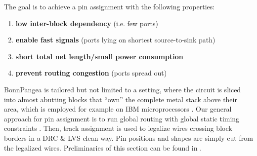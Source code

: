 \documentclass[a2paper]{bigsposter}
\begin{document}
\begin{blockrow}[3]
 \label{sec:modfied_global;_routing}
 The goal is to achieve a pin assignment with the following properties:
 \begin{enumerate}
 	\item \textbf{low inter-block dependency} (i.e. few ports)
 	\item \textbf{enable fast signals} (ports lying on shortest source-to-sink path)
 	\item \textbf{short total net length/small power consumption}
 	\item \textbf{prevent routing congestion} (ports spread out)
 \end{enumerate}
 BonnPangea is tailored but not limited to a setting, where the
 circuit is sliced into almost abutting blocks that ``own'' the
 complete metal stack above their area, which is employed for example
 on IBM microprocessors \cite{kazda+pangea:21}.
Our general approach for pin assignment is to run global routing with
global static timing constraints \cite{BRGTiming2}. Then, track
assignment \cite{BatterywalaTrackAssign,duran:2024} is used  to legalize wires crossing block borders in a DRC \& LVS clean way.
Pin positions and shapes are simply cut from the legalized wires.
Preliminaries of this section can be found in \cite{kazda+pangea:21}. 

\begin{comment}
	

  \blocktitle{Previous work}
  Early pin assignment algorithms were based on concentric circuits \cite{koren1972pin}
  and topological models \cite{brady1984approach}.
  Later, pin assignment was combined with global routing
  \cite{cong1991pin, wang1991simultaneous, KoideWY-PinAssignmentWithGLobalRouting96, Chen+IntegratedFloorplanningAndInterconnectPlanning:1999},
  considering congestion (essentially) on the block borders using a so-called channel connection graph, and deriving
  pin positions from global routing. Among these works,  \cite{wang1991simultaneous}  allows the creation of feedthrough routes.
  An integration of pin assignment  with floorplanning for two-pin nets is considered in  \cite{pedram1990floorplanning}.
  
  Minimum-cost flow algorithms for laying out all 2-pin nets from one
  block to all others simultaneously were used \cite{xiang2003min}, also
  including buffer planning \cite{xiang2005algorithm}.
  
  According to \cite{Scheffer-IndustrialFloorplanningAndPrototyping08}, most of the above techniques are not applied in industrial floorplanning tools.
  Instead,  a rough timing-aware routing is done on a flattened netlist and pins are assigned
  where the boundaries are crossed \cite{Scheffer-IndustrialFloorplanningAndPrototyping08}.
  Boundary assertions are mostly created based on the zero slack algorithm
  \cite{nair+berman+hauge+yoffa:1989,Scheffer-IndustrialFloorplanningAndPrototyping08}.
  \blockbreak
\end{comment}
\blockbreak
 

\end{blockrow}
\end{document}
